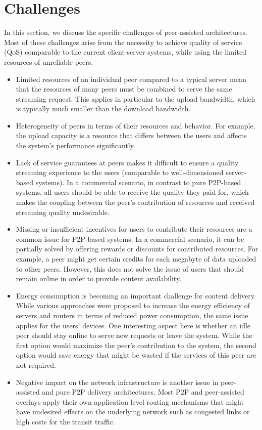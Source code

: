 \section{Challenges}
In this section, we discuss the specific challenges of peer-assisted architectures. 
Most of these challenges arise from the necessity to achieve quality of service (QoS) comparable to the current client-server systems, while using the limited resources of unreliable peers.
\begin{itemize}
	\item {Limited resources of an individual peer compared to a typical server mean that the resources of many peers must be combined to serve the same streaming request. 
	This applies in particular to the upload bandwidth, which is typically much smaller than the download bandwidth.}
	\item {Heterogeneity of peers in terms of their resources and behavior. 
	For example, the upload capacity is a resource that differs between the users and affects the system’s performance significantly.}
	\item {Lack of service guarantees at peers makes it difficult to ensure a quality streaming experience to the users (comparable to well-dimensioned server-based systems). 
	In a commercial scenario, in contrast to pure P2P-based systems, all users should be able to receive the quality they paid for, which makes the coupling between the peer’s contribution of resources and received streaming quality undesirable.}
	\item {Missing or insufficient incentives for users to contribute their resources are a common issue for P2P-based systems.
	In a commercial scenario, it can be partially solved by offering rewards or discounts for contributed resources.
	For example, a peer might get certain credits for each megabyte of data uploaded to other peers. 
	However, this does not solve the issue of users that should remain online in order to provide content availability.}
	\item {Energy consumption is becoming an important challenge for content delivery.
	While various approaches were proposed to increase the energy efficiency of servers and routers in terms of reduced power consumption, the same issue applies for the users’ devices. 
	One interesting aspect here is whether an idle peer should stay online to serve new requests or leave the system. 
	While the first option would maximize the peer’s contribution to the system, the second option would save energy that might be wasted if the services of this peer are not required.}
	\item {Negative impact on the network infrastructure is another issue in peer-assisted and pure P2P delivery architectures. 
	Most P2P and peer-assisted overlays apply their own application level routing mechanisms that might have undesired effects on the underlying network such as congested links or high costs for the transit traffic.}
\end{itemize}

